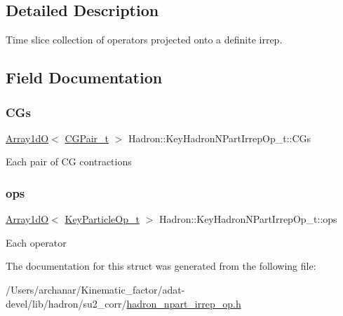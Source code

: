 \subsection{Detailed Description}
Time slice collection of operators projected onto a definite irrep. 

\subsection{Field Documentation}
\mbox{\label{structHadron_1_1KeyHadronNPartIrrepOp__t_ad578b34132c3bac4ce6145520e4e878d}} 
\subsubsection{\texorpdfstring{CGs}{CGs}}
{\footnotesize\ttfamily \mbox{\hyperlink{classADAT_1_1Array1dO}{Array1dO}}$<$ \mbox{\hyperlink{structHadron_1_1KeyHadronNPartIrrepOp__t_1_1CGPair__t}{C\+G\+Pair\+\_\+t}} $>$ Hadron\+::\+Key\+Hadron\+N\+Part\+Irrep\+Op\+\_\+t\+::\+C\+Gs}

Each pair of CG contractions \mbox{\label{structHadron_1_1KeyHadronNPartIrrepOp__t_a7784c45d582e672b8ade01f544e85cfe}} 
\subsubsection{\texorpdfstring{ops}{ops}}
{\footnotesize\ttfamily \mbox{\hyperlink{classADAT_1_1Array1dO}{Array1dO}}$<$ \mbox{\hyperlink{structHadron_1_1KeyParticleOp__t}{Key\+Particle\+Op\+\_\+t}} $>$ Hadron\+::\+Key\+Hadron\+N\+Part\+Irrep\+Op\+\_\+t\+::ops}

Each operator 

The documentation for this struct was generated from the following file\+:\begin{DoxyCompactItemize}
\item 
/\+Users/archanar/\+Kinematic\+\_\+factor/adat-\/devel/lib/hadron/su2\+\_\+corr/\mbox{\hyperlink{adat-devel_2lib_2hadron_2su2__corr_2hadron__npart__irrep__op_8h}{hadron\+\_\+npart\+\_\+irrep\+\_\+op.\+h}}\end{DoxyCompactItemize}
